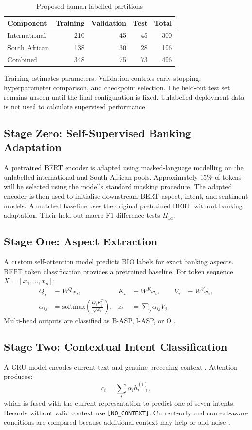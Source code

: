 \documentclass[11pt,a4paper]{article}
\begin{document}
\begin{table}[H]
\centering
\caption{Proposed human-labelled partitions}
\small
\begin{tabular}{p{4cm}r r r r}
\toprule
\textbf{Component} & \textbf{Training} & \textbf{Validation} & \textbf{Test} & \textbf{Total}\\
\midrule
International & 210 & 45 & 45 & 300\\
South African & 138 & 30 & 28 & 196\\
\midrule
Combined & 348 & 75 & 73 & 496\\
\bottomrule
\end{tabular}
\end{table}

Training estimates parameters. Validation controls early stopping, hyperparameter comparison, and checkpoint selection. The held-out test set remains unseen until the final configuration is fixed. Unlabelled deployment data is not used to calculate supervised performance.

\subsection{Stage Zero: Self-Supervised Banking Adaptation}
A pretrained BERT encoder is adapted using masked-language modelling on the unlabelled international and South African pools. Approximately 15\% of tokens will be selected using the model's standard masking procedure. The adapted encoder is then used to initialise downstream BERT aspect, intent, and sentiment models. A matched baseline uses the original pretrained BERT without banking adaptation. Their held-out macro-F1 difference tests $H_{1a}$.

\subsection{Stage One: Aspect Extraction}
A custom self-attention model predicts BIO labels for exact banking aspects. BERT token classification provides a pretrained baseline. For token sequence $X=[x_1,\ldots,x_n]$:
\begin{align}
Q_i&=W^Qx_i, & K_i&=W^Kx_i, & V_i&=W^Vx_i,\\
\alpha_{ij}&=\mathrm{softmax}\left(\frac{Q_iK_j^T}{\sqrt{d_k}}\right), & z_i&=\sum_j\alpha_{ij}V_j.
\end{align}
Multi-head outputs are classified as B-ASP, I-ASP, or O \citep{vaswani2017,chaudhry2025}.

\subsection{Stage Two: Contextual Intent Classification}
A GRU model encodes current text and genuine preceding context \citep{cho2014}. Attention produces:
\begin{equation}
c_t=\sum_i\alpha_i h_{t-1}^{(i)},
\end{equation}
which is fused with the current representation to predict one of seven intents. Records without valid context use \texttt{[NO\_CONTEXT]}. Current-only and context-aware conditions are compared because additional context may help or add noise \citep{visser2022}.
\end{document}
